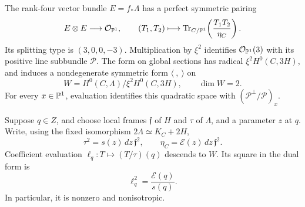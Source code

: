 \begin{lemma}\label{trace:pairing}
The rank-four vector bundle $E=f_*\Lambda$ has a perfect symmetric pairing
\begin{equation}\label{trace:form}
 E\otimes E\longrightarrow\mathcal O_{\mathbb P^1},\qquad
 (T_1,T_2)\longmapsto
 \operatorname{Tr}_{C/\mathbb P^1}\!\left(\frac{T_1T_2}{\eta_C}\right).
\end{equation}
Its splitting type is $(3,0,0,-3)$.  Multiplication by $\xi^2$ identifies
$\mathcal O_{\mathbb P^1}(3)$ with its positive line subbundle $\mathcal P$.
The form on global sections has radical
$\xi^2H^0(C,3H)$, and induces a nondegenerate symmetric form
$\langle\ ,\ \rangle$ on
\begin{equation}\label{trace:W}
 W=H^0(C,\Lambda)/\xi^2H^0(C,3H),\qquad \dim W=2.
\end{equation}
For every $x\in\mathbb P^1$, evaluation identifies this quadratic space with
$(\mathcal P^\perp/\mathcal P)_x$.

Suppose $q\in Z$, and choose local frames $\mathfrak f$ of $H$ and
$\tau$ of $\Lambda$, and a parameter $z$ at $q$.  Write, using the fixed
isomorphism $2\Lambda\simeq K_C+2H$,
\[
 \tau^2=s(z)\,dz\,\mathfrak f^2,
 \qquad \eta_C=\mathcal E(z)\,dz\,\mathfrak f^2.
\]
Coefficient evaluation $\ell_q:T\mapsto(T/\tau)(q)$ descends to $W$.
Its square in the dual form is
\begin{equation}\label{trace:dual-evaluation}
 \ell_q^2=\frac{\mathcal E(q)}{s(q)}.
\end{equation}
In particular, it is nonzero and nonisotropic.
\end{lemma}

